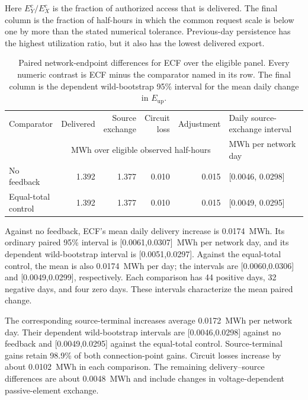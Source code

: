 \documentclass[11pt]{article}
\begin{document}
Here $E_Y^c/E_X^c$ is the fraction of authorized access that is delivered. The
final column is the fraction of half-hours in which the common request scale is
below one by more than the stated numerical tolerance. Previous-day persistence
has the highest utilization ratio, but it also has the lowest delivered export.

\begin{table}[!ht]
\centering
\caption{Paired network-endpoint differences for ECF over the eligible panel.
Every numeric contrast is ECF minus the comparator named in its row.
The final column is the dependent wild-bootstrap 95\% interval for the mean
daily change in $E_{\mathrm{up}}$.}
\label{tab:supp_au_network_endpoint_differences}
\scriptsize
\setlength{\tabcolsep}{2.5pt}
\begin{tabular}{@{}lrrrrp{}@{}}
\toprule
Comparator & Delivered & \shortstack{Source\\exchange} & \shortstack{Circuit\\loss} & Adjustment & Daily source-exchange interval \\
 & \multicolumn{4}{c}{MWh over eligible observed half-hours} & MWh per network day \\
\midrule
No feedback & 1.392 & 1.377 & 0.010 & 0.015 & [0.0046, 0.0298] \\
\shortstack{Equal-total\\control} & 1.392 & 1.377 & 0.010 & 0.015 & [0.0049, 0.0295] \\
\bottomrule
\end{tabular}
\end{table}

Against no feedback, ECF's mean daily delivery increase is 0.0174~MWh.
Its ordinary paired 95\% interval is [0.0061,0.0307]~MWh per network day,
and its dependent wild-bootstrap interval is [0.0051,0.0297].
Against the equal-total control, the mean is also 0.0174~MWh per day;
the intervals are [0.0060,0.0306] and [0.0049,0.0299], respectively.
Each comparison has 44 positive days, 32 negative days, and four zero days.
These intervals characterize the mean paired change.

The corresponding source-terminal increases average 0.0172~MWh per network
day. Their dependent wild-bootstrap intervals are [0.0046,0.0298] against
no feedback and [0.0049,0.0295] against the equal-total control.
Source-terminal gains retain 98.9\% of both connection-point gains.
Circuit losses increase by about 0.0102~MWh in each comparison. The remaining
delivery--source differences are about 0.0048~MWh and include changes in
voltage-dependent passive-element exchange.
\end{document}
